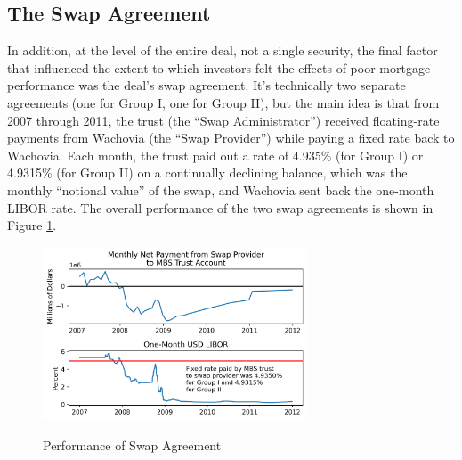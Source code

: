 \documentclass[12pt]{article}
\begin{document}
\subsection*{The Swap Agreement}

In addition, at the level of the entire deal, not a single security, the final factor that influenced the extent to which investors felt the effects of poor mortgage performance was the deal’s swap agreement. It’s technically two separate agreements (one for Group I, one for Group II), but the main idea is that from 2007 through 2011, the trust (the “Swap Administrator”) received floating-rate payments from Wachovia (the “Swap Provider”) while paying a fixed rate back to Wachovia. Each month, the trust paid out a rate of 4.935\% (for Group I) or 4.9315\% (for Group II) on a continually declining balance, which was the monthly “notional value” of the swap, and Wachovia sent back the one-month LIBOR rate. The overall performance of the two swap agreements is shown in Figure \ref{fig:timeseries_swap_performance}.

\begin{figure}[h]
	\centering
	\caption{Performance of Swap Agreement}
	\includegraphics[width=0.7\textwidth]{../figures/timeseries_swap_performance}
	\label{fig:timeseries_swap_performance}
\end{figure}
\end{document}
